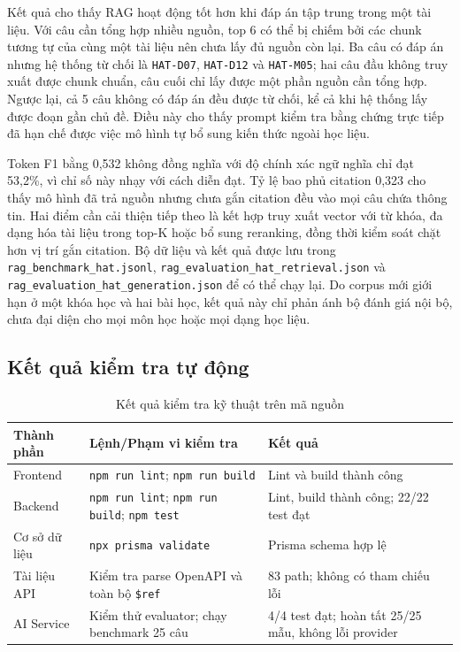 \documentclass[../DoAn.tex]{subfiles}
\begin{document}
Kết quả cho thấy RAG hoạt động tốt hơn khi đáp án tập trung trong một tài liệu. Với câu cần tổng hợp nhiều nguồn, top 6 có thể bị chiếm bởi các chunk tương tự của cùng một tài liệu nên chưa lấy đủ nguồn còn lại. Ba câu có đáp án nhưng hệ thống từ chối là \texttt{HAT-D07}, \texttt{HAT-D12} và \texttt{HAT-M05}; hai câu đầu không truy xuất được chunk chuẩn, câu cuối chỉ lấy được một phần nguồn cần tổng hợp. Ngược lại, cả 5 câu không có đáp án đều được từ chối, kể cả khi hệ thống lấy được đoạn gần chủ đề. Điều này cho thấy prompt kiểm tra bằng chứng trực tiếp đã hạn chế được việc mô hình tự bổ sung kiến thức ngoài học liệu.

Token F1 bằng 0,532 không đồng nghĩa với độ chính xác ngữ nghĩa chỉ đạt 53,2\%, vì chỉ số này nhạy với cách diễn đạt. Tỷ lệ bao phủ citation 0,323 cho thấy mô hình đã trả nguồn nhưng chưa gắn citation đều vào mọi câu chứa thông tin. Hai điểm cần cải thiện tiếp theo là kết hợp truy xuất vector với từ khóa, đa dạng hóa tài liệu trong top-K hoặc bổ sung reranking, đồng thời kiểm soát chặt hơn vị trí gắn citation. Bộ dữ liệu và kết quả được lưu trong \texttt{rag\_benchmark\_hat.jsonl}, \texttt{rag\_evaluation\_hat\_retrieval.json} và \texttt{rag\_evaluation\_hat\_generation.json} để có thể chạy lại. Do corpus mới giới hạn ở một khóa học và hai bài học, kết quả này chỉ phản ánh bộ đánh giá nội bộ, chưa đại diện cho mọi môn học hoặc mọi dạng học liệu.

\subsection{Kết quả kiểm tra tự động}

\begin{table}[H]
\centering
\caption{Kết quả kiểm tra kỹ thuật trên mã nguồn}
\label{tab:automated_verification}
\small
\renewcommand{\arraystretch}{1.3}
\begin{tabular}{|p{3.0cm}|p{5.6cm}|p{4.0cm}|}
\hline
\textbf{Thành phần} & \textbf{Lệnh/Phạm vi kiểm tra} & \textbf{Kết quả} \\ \hline
Frontend & \texttt{npm run lint}; \texttt{npm run build} & Lint và build thành công \\ \hline
Backend & \texttt{npm run lint}; \texttt{npm run build}; \texttt{npm test} & Lint, build thành công; 22/22 test đạt \\ \hline
Cơ sở dữ liệu & \texttt{npx prisma validate} & Prisma schema hợp lệ \\ \hline
Tài liệu API & Kiểm tra parse OpenAPI và toàn bộ \texttt{\$ref} & 83 path; không có tham chiếu lỗi \\ \hline
AI Service & Kiểm thử evaluator; chạy benchmark 25 câu & 4/4 test đạt; hoàn tất 25/25 mẫu, không lỗi provider \\ \hline
\end{tabular}
\end{table}
\end{document}
